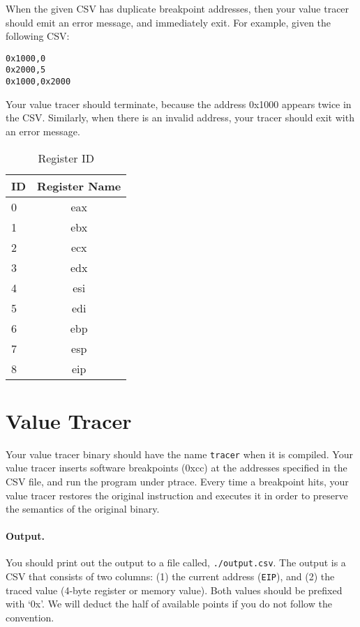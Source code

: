 \documentclass[a4paper, 11pt]{article}
\theoremstyle{definition}
\begin{document}
{When the given CSV has duplicate breakpoint addresses, then your value
tracer should emit an error message, and immediately exit. For
example, given the following CSV:
\begin{verbatim}
0x1000,0
0x2000,5
0x1000,0x2000
\end{verbatim}
%
Your value tracer should terminate, because the address 0x1000 appears
twice in the CSV. Similarly, when there is an invalid address, your
tracer should exit with an error message.

\begin{table}[h]
  \centering
  \begin{tabular}{lc}
    ID & Register Name \\\hline
    0 & eax \\
    1 & ebx \\
    2 & ecx \\
    3 & edx \\
    4 & esi \\
    5 & edi \\
    6 & ebp \\
    7 & esp \\
    8 & eip \\\hline
  \end{tabular}
  \caption{Register ID}
  \label{tab:regid}
\end{table}

\section{Value Tracer}

Your value tracer binary should have the name \texttt{tracer} when it
is compiled. Your value tracer inserts software breakpoints (0xcc) at
the addresses specified in the CSV file, and run the program under
ptrace. Every time a breakpoint hits, your value tracer restores the
original instruction and executes it in order to preserve the
semantics of the original binary.

\paragraph{Output.} You should print out the output to a file called,
\texttt{./output.csv}. The output is a CSV that consists of two
columns: (1) the current address (\texttt{EIP}), and (2) the traced
value (4-byte register or memory value). Both values should be
prefixed with `0x'.  We will deduct the half of available points if
you do not follow the convention.

}
\end{document}
